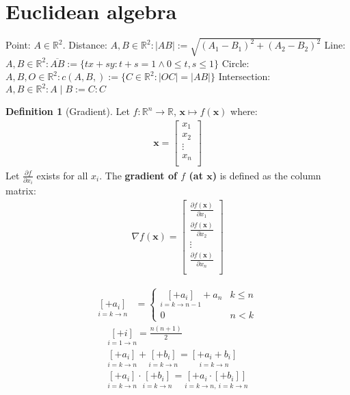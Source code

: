 \documentclass[a4paper,11pt]{article}
\theoremstyle{plain}
\theoremstyle{definition}
\newtheorem{definition}[theorem]{Definition}
\newcommand{\R}{\mathbb{R}}
\newcommand{\del}{\partial}
\begin{document}
\section{Euclidean algebra}
Point: $A\in\R^2$.\newline
Distance: $A,B\in\R^2:|AB|:=\sqrt{{(A_1-B_1)}^2+{(A_2-B_2)}^2}$\newline
Line: $A,B\in\R^2: \overline{AB}:=\{tx+sy:t+s=1\land 0\leq t,s\leq 1\}$\newline
Circle: $A,B,O\in\R^2:c(A,B,):=\{C\in\R^2:|OC|=|AB|\}$\newline
Intersection: $A,B\in\R^2: A\mid B:= C:C$
\newpage
\begin{definition}[Gradient]
	Let $f:\R^n\rightarrow\R$, $\mathbf{x}\mapsto f(\mathbf{x})$ where:
\begin{align*}
	\mathbf{x}=
		\begin{bmatrix}
			x_1 \\
			x_2 \\
			\vdots \\
			x_n \\
		\end{bmatrix}
\end{align*}
Let $\frac{\del f}{\del x_i}$ exists for all $x_i$. The \textbf{gradient of $f$
(at $\mathbf{x}$)} is defined as the column matrix:
\begin{align*}
	\nabla f(\mathbf{x})=
		\begin{bmatrix}
			\frac{\del f(\mathbf{x})}{\del x_1} \\
			\frac{\del f(\mathbf{x})}{\del x_2} \\
			\vdots \\
			\frac{\del f(\mathbf{x})}{\del x_n} \\
		\end{bmatrix}
\end{align*}
\end{definition}
\begin{align*}
	\underset{i=k\rightarrow n}{[+a_i]} &= 
	\begin{cases}
		\underset{i=k\rightarrow n-1}{[+a_i]}+a_n & k\leq n\\
		0 & n < k
	\end{cases}
\end{align*}
\begin{align*}
	\underset{i=1\rightarrow n}{[+i]}=\frac{n(n+1)}{2}\\
	\underset{i=k\rightarrow n}{[+a_i]}+\underset{i=k\rightarrow n}{[+b_i]}
	=\underset{i=k\rightarrow n}{[+a_i+b_i]}\\
	\underset{i=k\rightarrow n}{[+a_i]}\cdot\underset{i=k\rightarrow n}{[+b_i]}=
	\underset{i=k\rightarrow n,\ i=k\rightarrow n}{[+a_i\cdot[+b_i]]}
\end{align*}
\end{document}
